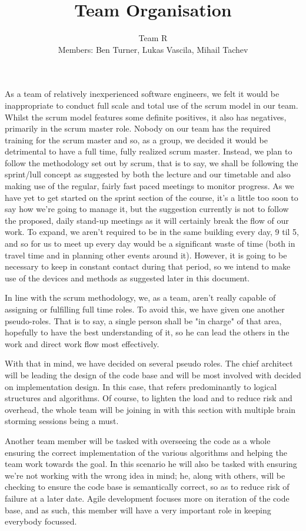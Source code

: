 \documentclass[11pt]{article}
\title{Team Organisation}
\date{Team R\\Members: Ben Turner, Lukas Vascila, Mihail Tachev}
\begin{document}
\maketitle

As a team of relatively inexperienced software engineers, we felt it
would be inappropriate to conduct full scale and total use of the
scrum model in our team. Whilst the scrum model features some
definite positives, it also has negatives, primarily in the scrum
master role. Nobody on our team has the required training for the
scrum master and so, as a group, we decided it would be detrimental
to have a full time, fully realized scrum master. Instead, we plan
to follow the methodology set out by scrum, that is to say, we shall
be following the sprint/lull concept as suggested by both the
lecture and our timetable and also making use of the regular, fairly
fast paced meetings to monitor progress. As we have yet to get
started on the sprint section of the course, it's a little too soon
to say how we're going to manage it, but the suggestion currently is
not to follow the proposed, daily stand-up meetings as it will
certainly break the flow of our work. To expand, we aren't required
to be in the same building every day, 9 til 5, and so for us to meet
up every day would be a significant waste of time (both in travel
time and in planning other events around it). However, it is going
to be necessary to keep in constant contact during that period, so
we intend to make use of the devices and methods as suggested later
in this document.

In line with the scrum methodology, we, as a team, aren't really
capable of assigning or fulfilling full time roles. To avoid this,
we have given one another pseudo-roles. That is to say, a single
person shall be "in charge" of that area, hopefully to have the best
understanding of it, so he can lead the others in the work and
direct work flow most effectively.

With that in mind, we have decided on several pseudo roles. The
chief architect will be leading the design of the code base and will
be most involved with decided on implementation design. In this
case, that refers predominantly to logical structures and
algorithms. Of course, to lighten the load and to reduce risk and
overhead, the whole team will be joining in with this section with
multiple brain storming sessions being a must.

Another team member will be tasked with overseeing the code as a
whole ensuring the correct implementation of the various algorithms
and helping the team work towards the goal. In this scenario he will
also be tasked with ensuring we're not working with the wrong idea
in mind; he, along with others, will be checking to ensure the code
base is semantically correct, so as to reduce risk of failure at a
later date. Agile development focuses more on iteration of the code
base, and as such, this member will have a very important role in
keeping everybody focussed.
\end{document}
